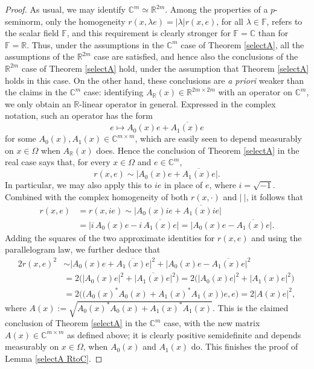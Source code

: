 \documentclass[11pt, reqno]{amsart}
\theoremstyle{definition}
\theoremstyle{remark}
\numberwithin{equation}{section}
\newcommand{\C}{\mathbb C}
\newcommand{\F}{\mathbb F}
\newcommand{\R}{\mathbb R}
\newcommand{\abs}[1]{|#1|}
\begin{document}
\begin{proof}
As usual, we may identify $\C^m\simeq\R^{2m}$.
Among the properties of a $p$-seminorm, only the homogeneity
$r(x,\lambda e)=\abs{\lambda}r(x,e)$, for all $\lambda\in\F$,
refers to the scalar field $\F$, and this requirement is clearly stronger for $\F=\C$ than for $\F=\R$. Thus, under the assumptions in the $\C^m$ case
of Theorem \ref{selectA}, all the assumptions of the $\R^{2m}$ case are satisfied, and hence also the conclusions of the $\R^{2m}$ case
of Theorem \ref{selectA} hold, under the assumption that Theorem \ref{selectA} holds in this case. On the other hand, these conclusions are {\em a priori} weaker than the claims in the $\C^m$ case: identifying $A_{\R}(x)\in\R^{2m\times 2m}$ with an operator on $\C^m$, we only obtain an $\R$-linear operator in general. Expressed in the complex notation, such an operator has the form
\begin{equation*}
e\mapsto A_0(x)e+\overline{A_1(x)e}
\end{equation*}
for some $A_0(x),A_1(x)\in\C^{m\times m}$, which are easily seen to depend measurably on $x\in\Omega$ when $A_{\R}(x)$ does. Hence the conclusion of Theorem \ref{selectA} in the real case says that, for every $x\in\Omega$ and $e\in\C^m$,
\begin{equation*}
r(x,e)\sim\big|A_0(x)e+\overline{A_1(x)e}\big|.
\end{equation*}
In particular, we may also apply this to $ie$ in place of $e$, where $i=\sqrt{-1}$.
Combined with the complex homogeneity of both $r(x,\cdot)$ and $\abs{\ }$, it follows that
\begin{align*}
r(x,e)
&=r(x,ie)
\sim \big|A_0(x)ie+\overline{A_1(x)ie}\big| \\
&=\big|i\,A_0(x)e-i\,\overline{A_1(x)e}\big|
=\big|A_0(x)e-\overline{A_1(x)e}\big|.
\end{align*}
Adding the squares of the two approximate identities for $r(x,e)$ and using the parallelogram law, we further deduce that
\begin{align*}
2r(x,e)^2
&\sim\big|A_0(x)e+\overline{A_1(x)e}\big|^2
+\big|A_0(x)e-\overline{A_1(x)e}\big|^2 \\
&=2\Big( \abs{A_0(x)e}^2+\big|\overline{A_1(x)e}\big|^2\Big)
=2\Big( \abs{A_0(x)e}^2+|A_1(x)e|^2\Big)  \\
&=2\Big( \big(A_0(x)^*A_0(x)+A_1(x)^*A_1(x)\big)e,e\Big)
=2\abs{A(x)e}^2,
\end{align*}
where $A(x):=\sqrt{A_0(x)^*A_0(x)+A_1(x)^*A_1(x)}$.
This is the claimed conclusion of Theorem \ref{selectA} in the $\C^m$ case, with the new matrix $A(x)\in\C^{m\times m}$ as defined above; it is clearly positive semidefinite and depends measurably on $x\in\Omega$, when $A_0(x)$ and $A_1(x)$ do.
This finishes the proof of Lemma \ref{selectA RtoC}.
\end{proof}
\end{document}
